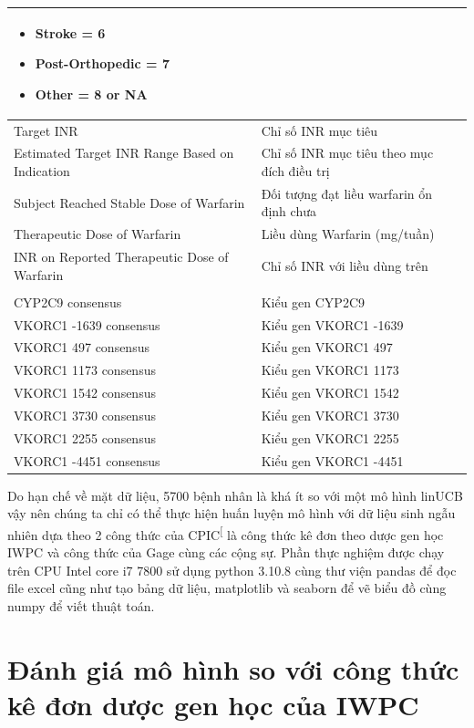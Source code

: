 \documentclass[14pt,oneside]{scrbook}
\begin{document}
\begin{ThreePartTable}
\begin{longtable}[]{|
  >{\raggedright\arraybackslash}p{}|
  >{\raggedright\arraybackslash}p{}|}
\begin{itemize}
            \item Stroke = 6
            \item Post-Orthopedic = 7
            \item Other = 8 or NA
        \end{itemize}
\\ \hline
 Target INR & Chỉ số INR mục tiêu\\ \hline
 Estimated Target INR Range Based on Indication & Chỉ số INR mục tiêu theo mục đích điều trị \\ \hline
 Subject Reached Stable Dose of Warfarin & Đối tượng đạt liều warfarin ổn định chưa \\ \hline
 Therapeutic Dose of Warfarin & Liều dùng Warfarin (mg/tuần)\\ \hline
 INR on Reported Therapeutic Dose of Warfarin & Chỉ số INR với liều dùng trên \\ \hline
\multicolumn{2}{|l|}{\textbf{Các thông tin về nhóm gen dược}} \\ \hline
 CYP2C9 consensus & Kiểu gen CYP2C9 \\ \hline
 VKORC1 -1639 consensus & Kiểu gen VKORC1 -1639 \\ \hline
 VKORC1 497 consensus & Kiểu gen VKORC1 497\\ \hline
 VKORC1 1173 consensus & Kiểu gen VKORC1 1173 \\ \hline
 VKORC1 1542 consensus & Kiểu gen VKORC1 1542 \\ \hline
 VKORC1 3730 consensus & Kiểu gen VKORC1 3730 \\ \hline
 VKORC1 2255 consensus & Kiểu gen VKORC1 2255 \\ \hline
 VKORC1 -4451 consensus & Kiểu gen VKORC1 -4451 \\ \hline
\end{longtable}
\end{ThreePartTable}

Do hạn chế về mặt dữ liệu, 5700 bệnh nhân là khá ít so với một mô hình
linUCB vậy nên chúng ta chỉ có thể thực hiện huấn luyện mô hình với dữ
liệu sinh ngẫu nhiên dựa theo 2 công thức của
CPIC\textsuperscript{{[}\citeproc{ref-cpic}{2}{]}} là công thức kê đơn
theo dược gen học IWPC và công thức của Gage cùng các cộng sự. Phần thực
nghiệm được chạy trên CPU Intel core i7 7800 sử dụng python 3.10.8 cùng
thư viện pandas để đọc file excel cũng như tạo bảng dữ liệu, matplotlib
và seaborn để vẽ biểu đồ cùng numpy để viết thuật toán.

\section{Đánh giá mô hình so với công thức kê đơn dược gen học của IWPC}\label{sux1eed-dux1ee5ng-cuxf4ng-thux1ee9c-kuxea-ux111ux1a1n-dux1b0ux1ee3c-gen-hux1ecdc-cux1ee7a-iwpc-ux111ux1ec3-ux111uxe1nh-giuxe1-muxf4-huxecnh}
\end{document}
